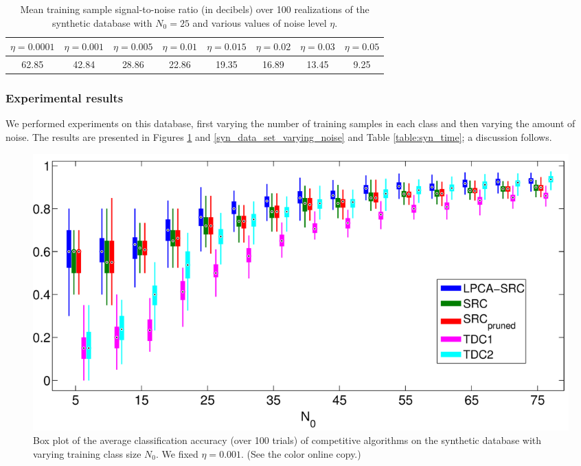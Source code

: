 \documentclass[review]{elsarticle}
\begin{document}
\begin{table}[!htb] 
\centering
\begin{tabular}{|c|c|c|c|c|c|c|c|}
\hline
$\eta = 0.0001$ & $\eta = 0.001$  & $\eta = 0.005$ & $\eta = 0.01$  & $\eta = 0.015$ & $\eta = 0.02$  & $\eta = 0.03$  & $\eta = 0.05$  \\
\hline
62.85	& 42.84	&	28.86	&	22.86	&	19.35	&	16.89	&	13.45	&	9.25 \\
\hline
\end{tabular}
\caption{Mean training sample signal-to-noise ratio (in decibels) over 100 realizations of the synthetic database with $N_0 = 25$ and various values of noise level $\eta$.\label{tab:snr}}
\end{table}



\subsubsection{Experimental results} \label{sec:syn_exps}

We performed experiments on this database, first varying the number of training samples in each class and then varying the amount of noise. The results are presented in Figures \ref{syn_data_set_varying_class_size} and \ref{syn_data_set_varying_noise} and Table \ref{table:syn_time}; a discussion follows.


\begin{figure}[t]
\begin{center}
\includegraphics[width=0.95\linewidth]{Fig_2}
\caption{Box plot of the average classification accuracy (over 100 trials) of competitive algorithms on the synthetic database with varying training class size $N_0$. We fixed $\eta = 0.001$. (See the color online copy.) }
\label{syn_data_set_varying_class_size}
\end{center}
\end{figure}
\end{document}
